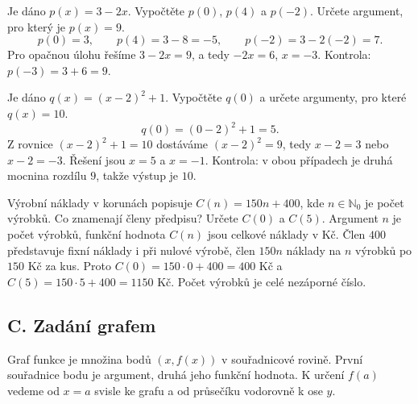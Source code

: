 \documentclass[11pt,a4paper]{article}
\begin{document}
\begin{prikladReseniBox}
Je dáno $p(x)=3-2x$. Vypočtěte $p(0)$, $p(4)$ a $p(-2)$. Určete argument, pro který je $p(x)=9$.
\tcblower
\[
p(0)=3,\qquad p(4)=3-8=-5,\qquad p(-2)=3-2(-2)=7.
\]
Pro opačnou úlohu řešíme $3-2x=9$, a tedy $-2x=6$, $x=-3$. Kontrola: $p(-3)=3+6=9$.
\end{prikladReseniBox}

\begin{prikladReseniBox}
Je dáno $q(x)=(x-2)^2+1$. Vypočtěte $q(0)$ a určete argumenty, pro které $q(x)=10$.
\tcblower
\[
q(0)=(0-2)^2+1=5.
\]
Z rovnice $(x-2)^2+1=10$ dostáváme $(x-2)^2=9$, tedy $x-2=3$ nebo $x-2=-3$. Řešení jsou $x=5$ a $x=-1$. Kontrola: v obou případech je druhá mocnina rozdílu $9$, takže výstup je $10$.
\end{prikladReseniBox}

\begin{prikladReseniBox}[title={Volitelné rozšíření: náklady na výrobu}]
Výrobní náklady v korunách popisuje $C(n)=150n+400$, kde $n\in\mathbb N_0$ je počet výrobků. Co znamenají členy předpisu? Určete $C(0)$ a $C(5)$.
\tcblower
Argument $n$ je počet výrobků, funkční hodnota $C(n)$ jsou celkové náklady v Kč. Člen $400$ představuje fixní náklady i při nulové výrobě, člen $150n$ náklady na $n$ výrobků po $150$ Kč za kus. Proto $C(0)=150\cdot0+400=400$ Kč a $C(5)=150\cdot5+400=1150$ Kč. Počet výrobků je celé nezáporné číslo.
\end{prikladReseniBox}

\subsection*{C. Zadání grafem}
Graf funkce je množina bodů $(x,f(x))$ v souřadnicové rovině. První souřadnice bodu je argument, druhá jeho funkční hodnota. K určení $f(a)$ vedeme od $x=a$ svisle ke grafu a od průsečíku vodorovně k ose $y$.

\begin{center}
\end{center}
\end{document}
